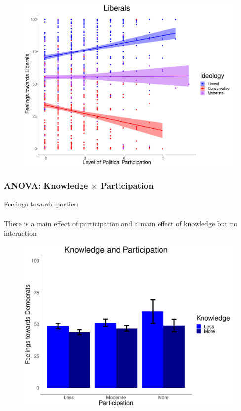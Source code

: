 \documentclass[14pt]{beamer}
\begin{document}
\begin{frame}
\begin{center}
\begin{figure}[ht!]  
	{	 \includegraphics[width=.9\textwidth]{PFLib}}
\end{figure}
\end{center}
\end{frame}

\begin{frame}
\frametitle{ANOVA: Knowledge $\times$ Participation}
\begin{center}
Feelings towards parties:
~~\\
~~\\
There is a main effect of participation and a main effect of knowledge but no interaction
\end{center}
\end{frame}

\begin{frame}
\begin{center}
	\begin{figure}[ht!]  
		{	 \includegraphics[width=.9\textwidth]{KPDem}}
	\end{figure}
\end{center}
\end{frame}
\end{document}
